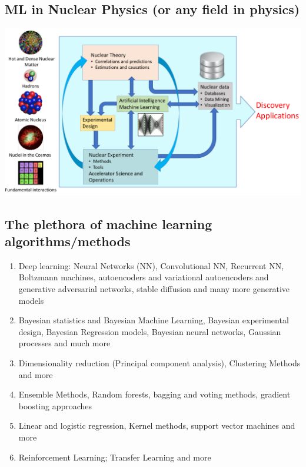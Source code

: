 \documentclass[%
oneside,                 %
final,                   %
10pt]{article}
\begin{document}
\vspace{6mm}

\subsection{ML in Nuclear  Physics (or any field in physics)}

\vspace{6mm}

\centerline{\includegraphics[width=1.0\linewidth]{figures/ML-NP.pdf}}

\vspace{6mm}

\subsection{The plethora  of machine learning algorithms/methods}

\begin{enumerate}
\item Deep learning: Neural Networks (NN), Convolutional NN, Recurrent NN, Boltzmann machines, autoencoders and variational autoencoders  and generative adversarial networks, stable diffusion and many more generative models

\item Bayesian statistics and Bayesian Machine Learning, Bayesian experimental design, Bayesian Regression models, Bayesian neural networks, Gaussian processes and much more

\item Dimensionality reduction (Principal component analysis), Clustering Methods and more

\item Ensemble Methods, Random forests, bagging and voting methods, gradient boosting approaches 

\item Linear and logistic regression, Kernel methods, support vector machines and more

\item Reinforcement Learning; Transfer Learning and more 
\end{enumerate}
\end{document}

